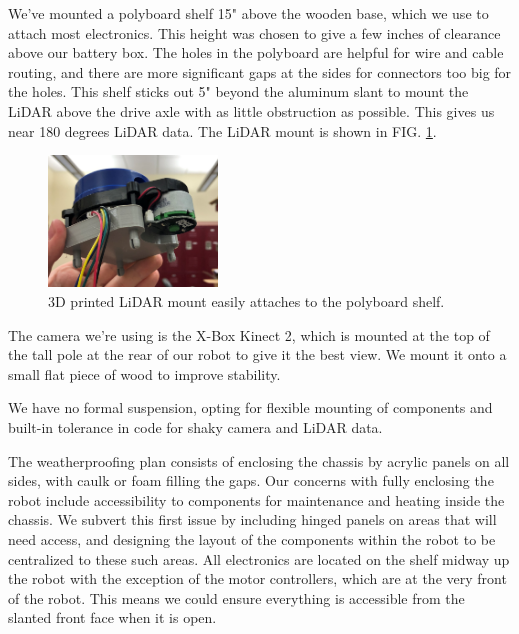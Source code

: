 We've mounted a polyboard shelf 15" above the wooden base, which we use to attach most electronics. This height was chosen to give a few inches of clearance above our battery box. The holes in the polyboard are helpful for wire and cable routing, and there are more significant gaps at the sides for connectors too big for the holes. This shelf sticks out 5" beyond the aluminum slant to mount the LiDAR above the drive axle with as little obstruction as possible. This gives us near 180 degrees LiDAR data. The LiDAR mount is shown in FIG. \ref{fig:mount:lidar}.

\begin{figure}[h]
    \centering
    \includegraphics[width=0.4\textwidth]{images/lidar_mount.PNG}
    \caption{3D printed LiDAR mount easily attaches to the polyboard shelf.}
    \label{fig:mount:lidar}
\end{figure}

The camera we're using is the X-Box Kinect 2, which is mounted at the top of the tall pole at the rear of our robot to give it the best view. We mount it onto a small flat piece of wood to improve stability.

We have no formal suspension, opting for flexible mounting of components and built-in tolerance in code for shaky camera and LiDAR data.

The weatherproofing plan consists of enclosing the chassis by acrylic panels on all sides, with caulk or foam filling the gaps. Our concerns with fully enclosing the robot include accessibility to components for maintenance and heating inside the chassis. We subvert this first issue by including hinged panels on areas that will need access, and designing the layout of the components within the robot to be centralized to these such areas. All electronics are located on the shelf midway up the robot with the exception of the motor controllers, which are at the very front of the robot. This means we could ensure everything is accessible from the slanted front face when it is open.

